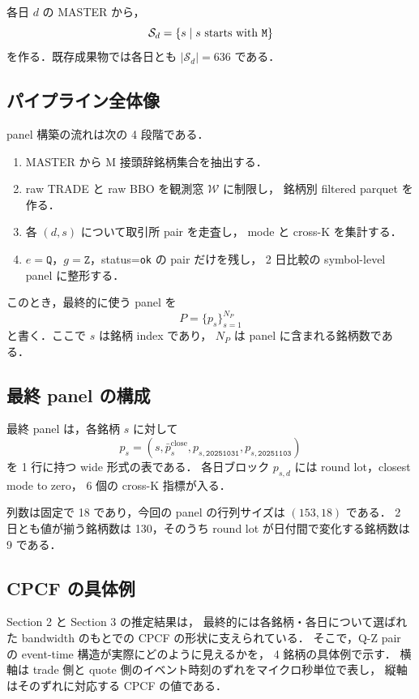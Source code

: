 \documentclass[a4paper,11pt]{jlreq}
\begin{document}
各日 \(d\) の MASTER から，
\[
  \mathcal{S}_d
  =
  \left\{
    s
    \mid
    s \text{ starts with \texttt{M}}
  \right\}
\]
を作る．既存成果物では各日とも \(|\mathcal{S}_d|=636\) である．

\subsection{パイプライン全体像}

panel 構築の流れは次の 4 段階である．

\begin{enumerate}
  \item MASTER から M 接頭辞銘柄集合を抽出する．
  \item raw TRADE と raw BBO を観測窓 \(\mathcal{W}\) に制限し，
        銘柄別 filtered parquet を作る．
  \item 各 \((d,s)\) について取引所 pair を走査し，
        mode と cross-K を集計する．
  \item \(e=\texttt{Q}\)，\(g=\texttt{Z}\)，status=\texttt{ok} の pair だけを残し，
        2 日比較の symbol-level panel に整形する．
\end{enumerate}

このとき，最終的に使う panel を
\[
  P=\{p_s\}_{s=1}^{N_P}
\]
と書く．ここで \(s\) は銘柄 index であり，
\(N_P\) は panel に含まれる銘柄数である．

\subsection{最終 panel の構成}

最終 panel は，各銘柄 \(s\) に対して
\[
  p_s =
  \left(
    s,
    \bar{p}^{\mathrm{close}}_s,
    p_{s,\texttt{20251031}},
    p_{s,\texttt{20251103}}
  \right)
\]
を 1 行に持つ wide 形式の表である．
各日ブロック \(p_{s,d}\) には round lot，closest mode to zero，
6 個の cross-K 指標が入る．

列数は固定で 18 であり，今回の panel の行列サイズは \((153,18)\) である．
2 日とも値が揃う銘柄数は 130，そのうち
round lot が日付間で変化する銘柄数は 9 である．

\subsection{CPCF の具体例}

Section 2 と Section 3 の推定結果は，
最終的には各銘柄・各日について選ばれた bandwidth のもとでの
CPCF の形状に支えられている．
そこで，Q-Z pair の event-time 構造が実際にどのように見えるかを，
4 銘柄の具体例で示す．
横軸は trade 側と quote 側のイベント時刻のずれをマイクロ秒単位で表し，
縦軸はそのずれに対応する CPCF の値である．
\end{document}
